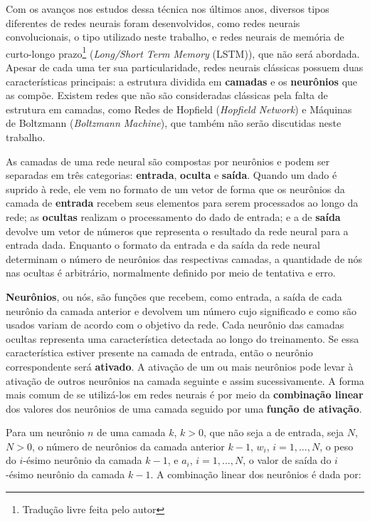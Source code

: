 Com os avanços nos estudos dessa técnica nos últimos anos, diversos tipos diferentes de redes neurais foram desenvolvidos, como redes neurais convolucionais, o tipo utilizado neste trabalho, e redes neurais de memória de curto-longo prazo\footnote{Tradução livre feita pelo autor} (\textit{Long/Short Term Memory} (LSTM)), que não será abordada.
Apesar de cada uma ter sua particularidade, redes neurais clássicas possuem duas características principais: a estrutura dividida em \textbf{camadas} e os \textbf{neurônios} que as compõe.
Existem redes que não são consideradas clássicas pela falta de estrutura em camadas, como Redes de Hopfield (\textit{Hopfield Network}) e Máquinas de Boltzmann (\textit{Boltzmann Machine}), que também não serão discutidas neste trabalho.

As camadas de uma rede neural são compostas por neurônios e podem ser separadas em três categorias: \textbf{entrada}, \textbf{oculta} e \textbf{saída}.
Quando um dado é suprido à rede, ele vem no formato de um vetor de forma que os neurônios da camada de \textbf{entrada} recebem seus elementos para serem processados ao longo da rede;
as \textbf{ocultas} realizam o processamento do dado de entrada;
e a de \textbf{saída} devolve um vetor de números que representa o resultado da rede neural para a entrada dada.
Enquanto o formato da entrada e da saída da rede neural determinam o número de neurônios das respectivas camadas, a quantidade de nós nas ocultas é arbitrário, normalmente definido por meio de tentativa e erro.

\textbf{Neurônios}, ou nós, são funções que recebem, como entrada, a saída de cada neurônio da camada anterior e devolvem um número
cujo significado e como são usados variam de acordo com o objetivo da rede.
Cada neurônio das camadas ocultas representa uma característica detectada ao longo do treinamento.
Se essa característica estiver presente na camada de entrada, então o neurônio correspondente será \textbf{ativado}.
A ativação de um ou mais neurônios pode levar à ativação de outros neurônios na camada seguinte e assim sucessivamente.
A forma mais comum de se utilizá-los em redes neurais é por meio da \textbf{combinação linear} dos valores dos neurônios de uma camada seguido por uma \textbf{função de ativação}.

Para um neurônio $n$ de uma camada $k$, $k > 0$, que não seja a de entrada, seja $N$, $N > 0$, o número de neurônios da camada anterior $k-1$, $w_{i}$, $i = 1, ..., N$, o peso do $i$-ésimo neurônio da camada $k-1$, e $a_{i}$, $i = 1, ..., N$, o valor de saída do $i$-ésimo neurônio da camada $k-1$.
A combinação linear dos neurônios é dada por:

